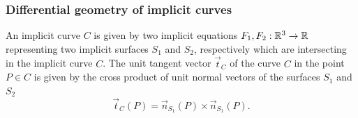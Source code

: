 \subsubsection {Differential geometry of implicit curves}

An implicit curve $C$ is
given by two implicit equations $F_1, F_2: \mathbb{R}^3 \to \mathbb{R}$ representing two implicit
surfaces $S_1$ and $S_2$, respectively which are intersecting in the implicit 
curve $C$. The unit tangent vector $\vec{t}_C$  
of the curve $C$ in the point $P \in C$ is given by the cross product of 
unit normal vectors of the surfaces $S_1$ and $S_2$
$$\vec{t}_C(P) = \vec{n}_{S_1}(P) \times \vec{n}_{S_1}(P).$$
